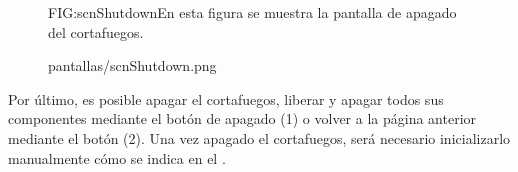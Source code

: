 \begin{figure}[Pantalla de apagado del cortafuegos]{FIG:scnShutdown}{En esta figura se muestra la pantalla de apagado del cortafuegos.}
  \begin{image}{}{}{pantallas/scnShutdown.png}
  \end{image}
\end{figure}

Por último, es posible apagar el cortafuegos, liberar y apagar todos sus componentes mediante el botón de apagado (1) o volver a la página  anterior mediante el botón (2). Una vez apagado el cortafuegos, será necesario inicializarlo manualmente cómo se indica en el .